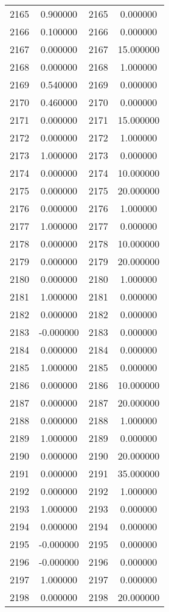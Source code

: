 \documentclass[12pt]{article}
\begin{document}
\begin{longtable}{@{}cccc@{}}
2165 & 0.900000 & 2165 & 0.000000 \\
2166 & 0.100000 & 2166 & 0.000000 \\
2167 & 0.000000 & 2167 & 15.000000 \\
2168 & 0.000000 & 2168 & 1.000000 \\
2169 & 0.540000 & 2169 & 0.000000 \\
2170 & 0.460000 & 2170 & 0.000000 \\
2171 & 0.000000 & 2171 & 15.000000 \\
2172 & 0.000000 & 2172 & 1.000000 \\
2173 & 1.000000 & 2173 & 0.000000 \\
2174 & 0.000000 & 2174 & 10.000000 \\
2175 & 0.000000 & 2175 & 20.000000 \\
2176 & 0.000000 & 2176 & 1.000000 \\
2177 & 1.000000 & 2177 & 0.000000 \\
2178 & 0.000000 & 2178 & 10.000000 \\
2179 & 0.000000 & 2179 & 20.000000 \\
2180 & 0.000000 & 2180 & 1.000000 \\
2181 & 1.000000 & 2181 & 0.000000 \\
2182 & 0.000000 & 2182 & 0.000000 \\
2183 & -0.000000 & 2183 & 0.000000 \\
2184 & 0.000000 & 2184 & 0.000000 \\
2185 & 1.000000 & 2185 & 0.000000 \\
2186 & 0.000000 & 2186 & 10.000000 \\
2187 & 0.000000 & 2187 & 20.000000 \\
2188 & 0.000000 & 2188 & 1.000000 \\
2189 & 1.000000 & 2189 & 0.000000 \\
2190 & 0.000000 & 2190 & 20.000000 \\
2191 & 0.000000 & 2191 & 35.000000 \\
2192 & 0.000000 & 2192 & 1.000000 \\
2193 & 1.000000 & 2193 & 0.000000 \\
2194 & 0.000000 & 2194 & 0.000000 \\
2195 & -0.000000 & 2195 & 0.000000 \\
2196 & -0.000000 & 2196 & 0.000000 \\
2197 & 1.000000 & 2197 & 0.000000 \\
2198 & 0.000000 & 2198 & 20.000000 \\

\end{longtable}
\end{document}

